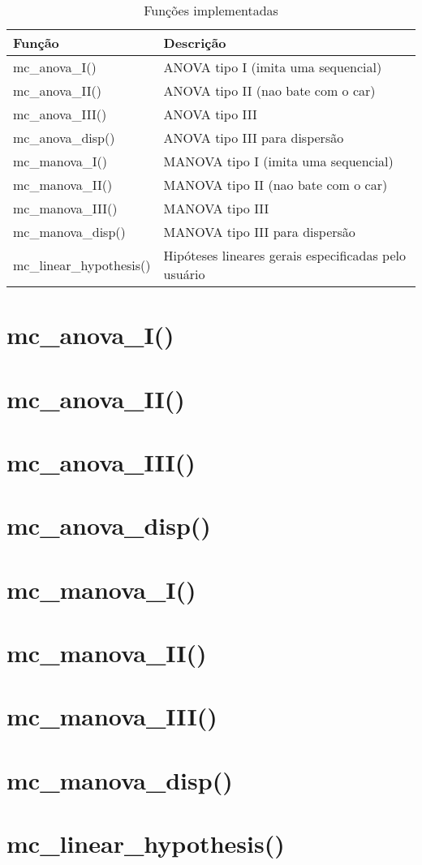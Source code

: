 \begin{table}[h]
\centering
\begin{tabular}{ll}
\hline
Função                   & Descrição                                            \\ \hline
mc\_anova\_I()           & ANOVA  tipo I   (imita uma sequencial)               \\
mc\_anova\_II()          & ANOVA  tipo II  (nao bate com o car)                 \\
mc\_anova\_III()         & ANOVA  tipo III                                      \\
mc\_anova\_disp()        & ANOVA  tipo III para dispersão                       \\
mc\_manova\_I()          & MANOVA tipo I   (imita uma sequencial)               \\
mc\_manova\_II()         & MANOVA tipo II  (nao bate com o car)                 \\
mc\_manova\_III()        & MANOVA tipo III                                      \\
mc\_manova\_disp()       & MANOVA tipo III para dispersão                       \\
mc\_linear\_hypothesis() & Hipóteses lineares gerais especificadas pelo usuário \\ \hline
\end{tabular}
\caption{Funções implementadas}
\label{tab:funcoes}
\end{table}

\section{mc\_anova\_I()}

\section{mc\_anova\_II()}

\section{mc\_anova\_III()}

\section{mc\_anova\_disp()}

\section{mc\_manova\_I()}

\section{mc\_manova\_II()}

\section{mc\_manova\_III()}

\section{mc\_manova\_disp()}

\section{mc\_linear\_hypothesis()}

